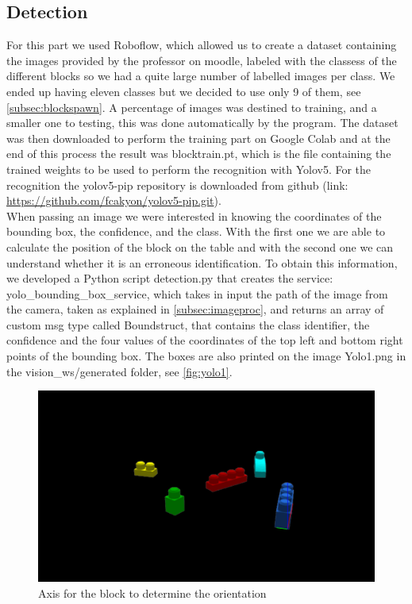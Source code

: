 \documentclass[12pt,a4paper]{article}
\begin{document}
\subsection{Detection}\label{subsec:detect}
For this part we used Roboflow, which allowed us to create a dataset containing the images provided by the professor on moodle, labeled with the classess of the different blocks so we had a quite large number of labelled images per class. We ended up having eleven classes but we decided to use only 9 of them, see \ref{subsec:blockspawn}. A percentage of images was destined to training, and a smaller one to testing, this was done automatically by the program. The dataset was then downloaded to perform the training part on Google Colab and at the end of this process the result was blocktrain.pt, which is the file containing the trained weights to be used to perform the recognition with Yolov5. 
For the recognition the yolov5-pip repository is downloaded from github (link: \url{https://github.com/fcakyon/yolov5-pip.git}).\\
When passing an image we were interested in knowing the coordinates of the bounding box, the confidence, and the class. With the first one we are able to calculate the position of the block on the table and with the second one we can understand whether it is an erroneous identification. To obtain this information, we developed a Python script detection.py that creates the service: yolo\_bounding\_box\_service, which takes in input the path of the image from the camera, taken as explained in \ref{subsec:imageproc}, and returns an array of custom msg type called Boundstruct, that contains the class identifier, the confidence and the four values of the coordinates of the top left and bottom right points of the bounding box. The boxes are also printed on the image Yolo1.png in the vision\_ws/generated folder, see \ref{fig:yolo1}.
\begin{center}
    \begin{figure}
        \centering
        \includegraphics[width=1.0\columnwidth]{images/Obj1.png}
        \caption{Axis for the block to determine the orientation}
        \label{fig:obj1}
    \end{figure}
\end{center}
\end{document}
